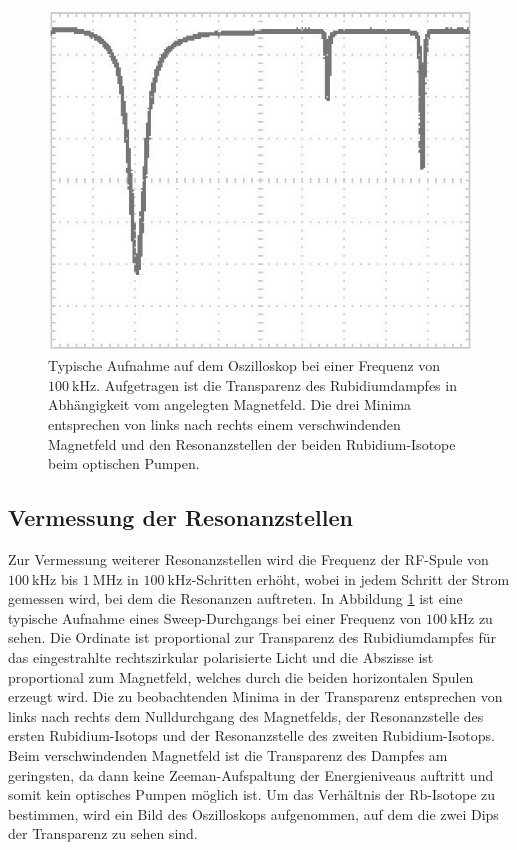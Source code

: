 \begin{figure}[h]
	\centering
	\includegraphics[width=0.7\linewidth]{img/oszi1_2}
	\caption{Typische Aufnahme auf dem Oszilloskop bei einer Frequenz von $\SI{100}{\kilo \hertz}$. Aufgetragen ist die Transparenz des Rubidiumdampfes in Abhängigkeit vom angelegten Magnetfeld. Die drei Minima entsprechen von links nach rechts einem verschwindenden Magnetfeld und den Resonanzstellen der beiden Rubidium-Isotope beim optischen Pumpen.}
	\label{fig:oszi1_2}
\end{figure}

\subsection{Vermessung der Resonanzstellen}
Zur Vermessung weiterer Resonanzstellen wird die Frequenz der RF-Spule von $\SI{100}{\kilo \hertz}$ bis $\SI{1}{\mega \hertz}$ in $\SI{100}{\kilo \hertz}$-Schritten erhöht, wobei in jedem Schritt der Strom gemessen wird, bei dem die Resonanzen auftreten. In Abbildung \ref{fig:oszi1_2} ist eine typische Aufnahme eines Sweep-Durchgangs bei einer Frequenz von $\SI{100}{\kilo \hertz}$ zu sehen. Die Ordinate ist proportional zur Transparenz des Rubidiumdampfes für das eingestrahlte rechtszirkular polarisierte Licht und die Abszisse ist proportional zum Magnetfeld, welches durch die beiden horizontalen Spulen erzeugt wird. Die zu beobachtenden Minima in der Transparenz entsprechen von links nach rechts dem Nulldurchgang des Magnetfelds, der Resonanzstelle des ersten Rubidium-Isotops und der Resonanzstelle des zweiten Rubidium-Isotops. Beim verschwindenden Magnetfeld ist die Transparenz des Dampfes am geringsten, da dann keine Zeeman-Aufspaltung der Energieniveaus auftritt und somit kein optisches Pumpen möglich ist. Um das Verhältnis der Rb-Isotope zu bestimmen, wird ein Bild des Oszilloskops aufgenommen, auf dem die zwei Dips der Transparenz zu sehen sind. 

